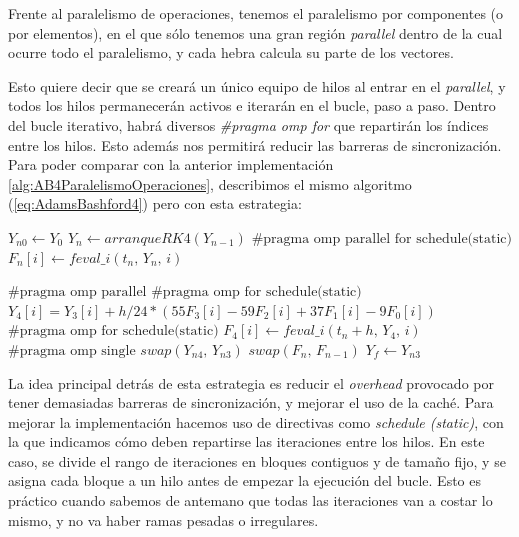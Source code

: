 
Frente al paralelismo de operaciones, tenemos el paralelismo por componentes (o por elementos), en el que sólo tenemos una gran región \textit{parallel} dentro de la cual ocurre todo el paralelismo, y cada hebra calcula su parte de los vectores.

Esto quiere decir que se creará un único equipo de hilos al entrar en el \textit{parallel}, y todos los hilos permanecerán activos e iterarán en el bucle, paso a paso. Dentro del bucle iterativo, habrá diversos \textit{\#pragma omp for} que repartirán los índices entre los hilos. Esto además nos permitirá reducir las barreras de sincronización. Para poder comparar con la anterior implementación \ref{alg:AB4ParalelismoOperaciones}, describimos el mismo algoritmo (\ref{eq:AdamsBashford4}) pero con esta estrategia:

\begin{algorithm}[H]
	\begin{algorithmic}
		\State $ Y_{n0} \gets Y_0 $
		\State $ Y_n \gets arranqueRK4(Y_{n-1})$ 
		\State $ \text{\#pragma omp parallel for schedule(static)} $
			\State $ F_n[i] \gets feval\_i(t_n\text{, }Y_n\text{, }i)$ 
		\EndFor
		
		\State $ \text{\#pragma omp parallel} $
			\State $ \text{\#pragma omp for schedule(static)} $
				\State $ Y_4[i] = Y_3[i] + h/24 * ( 55F_3[i] - 59F_2[i] + 37F_1[i] -9F_0[i]) $
			\EndFor
			\State $ \text{\#pragma omp for schedule(static)} $
				\State $ F_4[i] \gets feval\_i(t_n+h\text{, }Y_4\text{, }i)$
			\EndFor
			\State $ \text{\#pragma omp single} $
			\State $ swap(Y_{n4}\text{, }Y_{n3}) $
			\State $ swap(F_n\text{, }F_{n-1}) $ 
		\EndFor
		\State $Y_f \gets Y_{n3}$
	\end{algorithmic}
	\caption{Implementación de AB4 con Paralelismo por Componentes}
	\label{alg:AB4ParalelismoComponentes}
\end{algorithm}

La idea principal detrás de esta estrategia es reducir el \textit{overhead} provocado por tener demasiadas barreras de sincronización, y mejorar el uso de la caché. Para mejorar la implementación hacemos uso de directivas como \textit{schedule (static)}, con la que indicamos cómo deben repartirse las iteraciones entre los hilos. En este caso, se divide el rango de iteraciones en bloques contiguos y de tamaño fijo, y se asigna cada bloque a un hilo antes de empezar la ejecución del bucle. Esto es práctico cuando sabemos de antemano que todas las iteraciones van a costar lo mismo, y no va haber ramas pesadas o irregulares.

